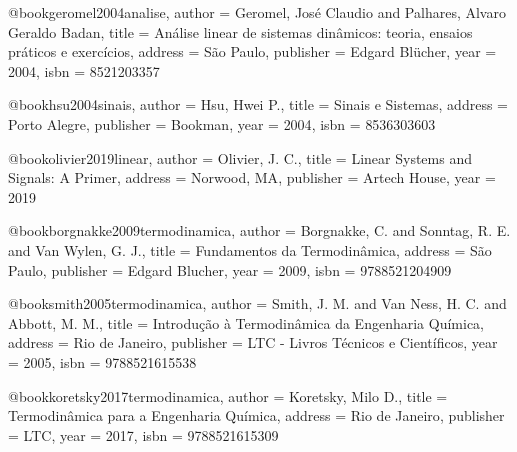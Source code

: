 @book{geromel2004analise,
  author = {Geromel, José Claudio and Palhares, Alvaro Geraldo Badan},
  title = {Análise linear de sistemas dinâmicos: teoria, ensaios práticos e exercícios},
  address = {São Paulo},
  publisher = {Edgard Blücher},
  year = {2004},
  isbn = {8521203357}
}

@book{hsu2004sinais,
  author = {Hsu, Hwei P.},
  title = {Sinais e Sistemas},
  address = {Porto Alegre},
  publisher = {Bookman},
  year = {2004},
  isbn = {8536303603}
}

@book{olivier2019linear,
  author = {Olivier, J. C.},
  title = {Linear Systems and Signals: A Primer},
  address = {Norwood, MA},
  publisher = {Artech House},
  year = {2019}
}

%

@book{borgnakke2009termodinamica,
  author = {Borgnakke, C. and Sonntag, R. E. and Van Wylen, G. J.},
  title = {Fundamentos da Termodinâmica},
  address = {São Paulo},
  publisher = {Edgard Blucher},
  year = {2009},
  isbn = {9788521204909}
}

@book{smith2005termodinamica,
  author = {Smith, J. M. and Van Ness, H. C. and Abbott, M. M.},
  title = {Introdução à Termodinâmica da Engenharia Química},
  address = {Rio de Janeiro},
  publisher = {LTC - Livros Técnicos e Científicos},
  year = {2005},
  isbn = {9788521615538}
}

@book{koretsky2017termodinamica,
  author = {Koretsky, Milo D.},
  title = {Termodinâmica para a Engenharia Química},
  address = {Rio de Janeiro},
  publisher = {LTC},
  year = {2017},
  isbn = {9788521615309}
}

